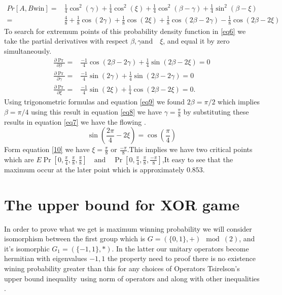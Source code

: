 \begin{align}
Pr[A,B \text{win}]=& \frac{1}{4} \cos^2(\gamma)+\frac{1}{4} \cos^2(\xi)+\frac{1}{4} \cos^2(\beta-\gamma)+\frac{1}{4} \sin^2(\beta-\xi)\label{finpr}\\ 
=&\frac{4}{8} +\frac{1}{8}  \cos(2 \gamma)+\frac{1}{8}  \cos(2 \xi)+\frac{1}{8}  \cos(2\beta-2\gamma)-\frac{1}{8} \cos(2\beta-2\xi)\label{eq6}
\end{align}
To search for extremum points of this probability density function in \ref{eq6} we take the partial derivatives with respect $\beta ,\gamma  \text{and} \quad \xi$,  and equal it by zero simultaneously.
\begin{align}
\frac{\partial \Pr}{\partial \beta}=& \frac{-1}{4}\cos(2\beta-2\gamma)+ \frac{1}{4}\sin(2\beta-2\xi)=0\label{eq7} \\
\frac{\partial\Pr}{\partial \gamma}=& \frac{-1}{4}\sin(2\gamma)+ \frac{1}{4}\sin(2\beta-2\gamma)=0\label{eq8}\\
\frac{\partial \Pr}{\partial \xi}=& \frac{-1}{4}\sin(2\xi)+ \frac{1}{4}\cos(2\beta-2\xi)=0\label{eq9}.
\end{align}
Using trigonometric formulas and  equation  \ref{eq9} we found $2\beta=\pi/2$ which implies $\beta=\pi/4$
using this result in equation \ref{eq8} we have $ \gamma=\frac{\pi}{8}$ by substituting these results in equation \ref{eq7} we have the flowing .
\begin{equation}
\sin(\frac{2\pi}{4}-2\xi)=\cos(\frac{\pi}{4})\label{10}
\end{equation}
Form   equation  \ref{10} we have $\xi=\frac{\pi}{8}$ or $\frac{-\pi}{8}$.This implies we have two critical points which are $E\Pr[0,\frac{\pi}{4},\frac{\pi}{8} ,\frac{\pi}{8}] \quad \text{and}\quad \Pr[0,\frac{\pi}{4},\frac{\pi}{8} ,\frac{-\pi}{8}]$,It easy to see that the maximum occur at the  later  point which is  approximately $0.853$.


\section{The upper bound for XOR game}
In order to prove what we get is maximum winning  probability we will consider isomorphism between  the first group   which is $G=(\{0,1\},+) \mod(2)$, and it's isomorphic  $ G_1=(\{-1,1\},*)$. In the latter our unitary operators  become hermitian with eigenvalues ${-1,1}$ the property need to proof there is  no existence wining probability greater than this for any choices of Operators Tsirelson’s  upper bound inequality~\citep{Cirel'son1980}using  norm of operators  and along with other inequalities .%

